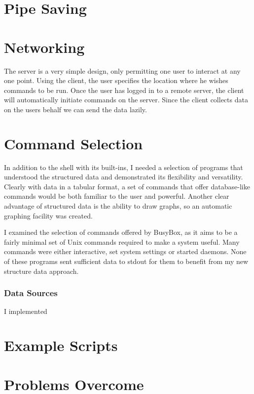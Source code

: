 \documentclass[12pt,twoside,notitlepage]{report}
\begin{document}
\section{Pipe Saving}

\section{Networking}

The server is a very simple design, only permitting one user to interact at any
one point. Using the client, the user specifies the location where he wishes
commands to be run. Once the user has logged in to a remote server, the client
will automatically initiate commands on the server. Since the client collects
data on the users behalf we can send the data lazily.

\section{Command Selection}
In addition to the shell with its built-ins, I needed a selection of programs
that understood the structured data and demonstrated its flexibility and
versatility. Clearly with data in a tabular format, a set of commands that offer
database-like commands would be both familiar to the user and powerful. Another
clear advantage of structured data is the ability to draw graphs, so an
automatic graphing facility was created.

I examined the selection of commands offered by BusyBox, as it aims to be a
fairly minimal set of Unix commands required to make a system useful. Many
commands were either interactive, set system settings or started daemons. None
of these programs sent sufficient data to stdout for them to benefit from my
new structure data approach.


\subsubsection{Data Sources}
I implemented 

\section{Example Scripts}

\section{Problems Overcome}
\end{document}
